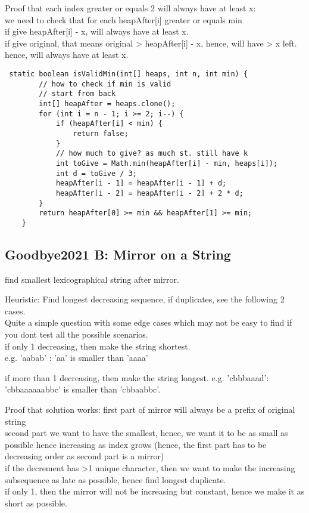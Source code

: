 \documentclass[12pt]{article}
\begin{document}
Proof that each index greater or equals 2 will always have at least x: \\ 
we need to check that for each heapAfter[i] greater or equals min \\ 
if give heapAfter[i] - x, will always have at least x. \\ 
if give original, that means original > heapAfter[i] - x, hence, will have > x left. \\ 
hence, will always have at least x. 

\begin{verbatim} 
 static boolean isValidMin(int[] heaps, int n, int min) {
        // how to check if min is valid
        // start from back
        int[] heapAfter = heaps.clone();
        for (int i = n - 1; i >= 2; i--) {
            if (heapAfter[i] < min) {
                return false;
            }
            // how much to give? as much st. still have k
            int toGive = Math.min(heapAfter[i] - min, heaps[i]);
            int d = toGive / 3;
            heapAfter[i - 1] = heapAfter[i - 1] + d;
            heapAfter[i - 2] = heapAfter[i - 2] + 2 * d;
        }
        return heapAfter[0] >= min && heapAfter[1] >= min;
    }
\end{verbatim} 

\subsection{Goodbye2021 B: Mirror on a String} 
find smallest lexicographical string after mirror. 

Heuristic: 
Find longest decreasing sequence, if duplicates, see the following 2 cases. \\ 
Quite a simple question with some edge cases which may not be easy to find if you dont test all the possible scenarios. \\ 

if only 1 decreasing, then make the string shortest. \\ 
e.g. 'aabab' : 'aa' is smaller than 'aaaa' 

if more than 1 decreasing, then make the string longest. 
e.g. 'cbbbaaad': 'cbbaaaaaabbc' is smaller than 'cbbaabbc'. 
 
 Proof that solution works: 
 first part of mirror will always be a prefix of original string \\ 
 second part we want to have the smallest, hence, we want it to be as small as possible hence increasing as index grows (hence, the first part has to be decreasing order as second part is a mirror) \\ 
 if the decrement has >1 unique character, then we want to make the increasing subsequence as late as possible, hence find longest duplicate. \\ 
 if only 1, then the mirror will not be increasing but constant, hence we make it as short as possible. 
 
\end{document}
